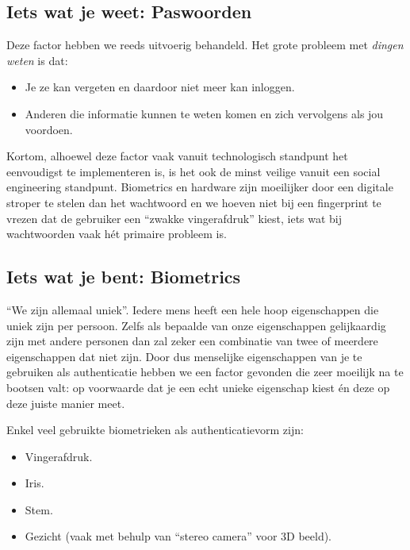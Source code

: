 \documentclass[
  10pt,
  dutch,
  paper=a4,
  ,captions=tableheading
]{scrbook}
\providecommand{\tightlist}{%
  \setlength{\itemsep}{0pt}\setlength{\parskip}{0pt}}
\begin{document}
\subsection{Iets wat je weet:
Paswoorden}\label{iets-wat-je-weet-paswoorden}

Deze factor hebben we reeds uitvoerig behandeld. Het grote probleem met
\emph{dingen weten} is dat:

\begin{itemize}
\tightlist
\item
  Je ze kan vergeten en daardoor niet meer kan inloggen.
\item
  Anderen die informatie kunnen te weten komen en zich vervolgens als
  jou voordoen.
\end{itemize}

Kortom, alhoewel deze factor vaak vanuit technologisch standpunt het
eenvoudigst te implementeren is, is het ook de minst veilige vanuit een
social engineering standpunt. Biometrics en hardware zijn moeilijker
door een digitale stroper te stelen dan het wachtwoord en we hoeven niet
bij een fingerprint te vrezen dat de gebruiker een ``zwakke
vingerafdruk'' kiest, iets wat bij wachtwoorden vaak hét primaire
probleem is.

\subsection{Iets wat je bent:
Biometrics}\label{iets-wat-je-bent-biometrics}

``We zijn allemaal uniek''. Iedere mens heeft een hele hoop
eigenschappen die uniek zijn per persoon. Zelfs als bepaalde van onze
eigenschappen gelijkaardig zijn met andere personen dan zal zeker een
combinatie van twee of meerdere eigenschappen dat niet zijn. Door dus
menselijke eigenschappen van je te gebruiken als authenticatie hebben we
een factor gevonden die zeer moeilijk na te bootsen valt: op voorwaarde
dat je een echt unieke eigenschap kiest én deze op deze juiste manier
meet.

Enkel veel gebruikte biometrieken als authenticatievorm zijn:

\begin{itemize}
\tightlist
\item
  Vingerafdruk.
\item
  Iris.
\item
  Stem.
\item
  Gezicht (vaak met behulp van ``stereo camera'' voor 3D beeld).
\end{itemize}
\end{document}
